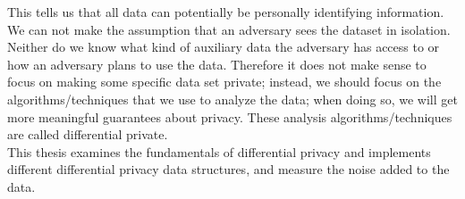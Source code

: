 \documentclass[11pt]{article}
\theoremstyle{definition}
\begin{document}
\noindent This tells us that all data can potentially be personally identifying information. We can not make the assumption that an adversary sees the dataset in isolation. Neither do we know what kind of auxiliary data the adversary has access to or how an adversary plans to use the data. Therefore it does not make sense to focus on making some specific data set private;  instead, we should focus on the algorithms/techniques that we use to analyze the data; when doing so, we will get more meaningful guarantees about privacy.  These analysis algorithms/techniques are called differential private.\\

This thesis examines the fundamentals of differential privacy and implements different differential privacy data structures, and measure the noise added to the data.


\end{document}
